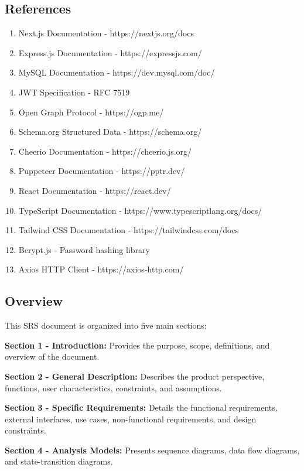 \documentclass[12pt,a4paper]{article}
\begin{document}
\subsection{References}

\begin{enumerate}
    \item Next.js Documentation - https://nextjs.org/docs
    \item Express.js Documentation - https://expressjs.com/
    \item MySQL Documentation - https://dev.mysql.com/doc/
    \item JWT Specification - RFC 7519
    \item Open Graph Protocol - https://ogp.me/
    \item Schema.org Structured Data - https://schema.org/
    \item Cheerio Documentation - https://cheerio.js.org/
    \item Puppeteer Documentation - https://pptr.dev/
    \item React Documentation - https://react.dev/
    \item TypeScript Documentation - https://www.typescriptlang.org/docs/
    \item Tailwind CSS Documentation - https://tailwindcss.com/docs
    \item Bcrypt.js - Password hashing library
    \item Axios HTTP Client - https://axios-http.com/
\end{enumerate}

\subsection{Overview}

This SRS document is organized into five main sections:

\textbf{Section 1 - Introduction:} Provides the purpose, scope, definitions, and overview of the document.

\textbf{Section 2 - General Description:} Describes the product perspective, functions, user characteristics, constraints, and assumptions.

\textbf{Section 3 - Specific Requirements:} Details the functional requirements, external interfaces, use cases, non-functional requirements, and design constraints.

\textbf{Section 4 - Analysis Models:} Presents sequence diagrams, data flow diagrams, and state-transition diagrams.
\end{document}
